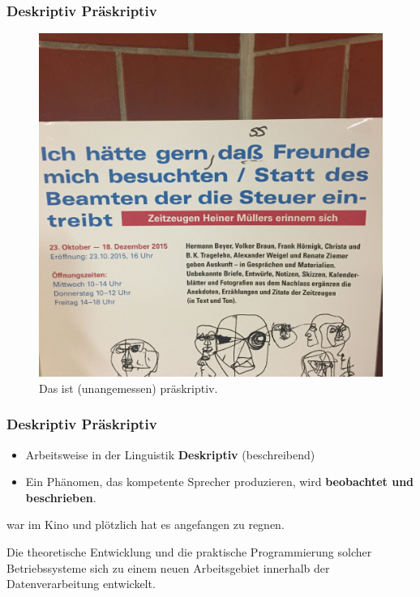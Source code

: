 \begin{frame}
\frametitle{Deskriptiv \vs Präskriptiv}

\begin{figure}
\centering
	\includegraphics[scale=.065]{material/05praeskriptiv}
	\caption{Das ist (unangemessen) präskriptiv.}
\end{figure}

\end{frame}

\begin{frame}
\frametitle{Deskriptiv \vs Präskriptiv}

\begin{itemize}
	\item Arbeitsweise in der Linguistik \ras \textbf{Deskriptiv} (beschreibend)

	\item Ein Phänomen, das kompetente Sprecher produzieren, wird \textbf{beobachtet und beschrieben}. 	

\end{itemize}
	
	\ea {} war im Kino und plötzlich hat es angefangen zu regnen.
	\z
	
	\ea Die theoretische Entwicklung und die praktische Programmierung solcher Betriebssysteme  sich zu einem neuen Arbeitsgebiet innerhalb der Datenverarbeitung entwickelt. \hfill \citep{Goschler14a}
	\z
	


\end{frame}

